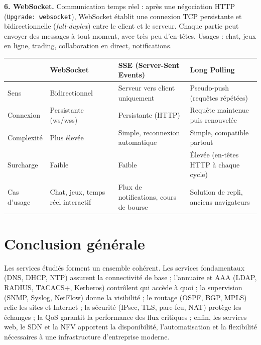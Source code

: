 \documentclass[12pt,a4paper]{article}
\begin{document}
\textbf{6. WebSocket.} Communication temps réel : après une négociation
HTTP (\texttt{Upgrade: websocket}), WebSocket établit une connexion TCP
persistante et bidirectionnelle (\textit{full-duplex}) entre le client et
le serveur. Chaque partie peut envoyer des messages à tout moment, avec
très peu d'en-têtes. Usages : chat, jeux en ligne, trading, collaboration
en direct, notifications.

\begin{longtable}{|L{2.2cm}|L{4.1cm}|L{4.1cm}|L{4.1cm}|}
\hline
 & \textbf{WebSocket} & \textbf{SSE (Server-Sent Events)} &
\textbf{Long Polling} \\ \hline
Sens & Bidirectionnel & Serveur vers client uniquement & Pseudo-push
(requêtes répétées) \\ \hline
Connexion & Persistante (ws/wss) & Persistante (HTTP) & Requête
maintenue puis renouvelée \\ \hline
Complexité & Plus élevée & Simple, reconnexion automatique & Simple,
compatible partout \\ \hline
Surcharge & Faible & Faible & Élevée (en-têtes HTTP à chaque cycle) \\
\hline
Cas d'usage & Chat, jeux, temps réel interactif & Flux de notifications,
cours de bourse & Solution de repli, anciens navigateurs \\ \hline
\end{longtable}


\section{Conclusion générale}

Les services étudiés forment un ensemble cohérent. Les services
fondamentaux (DNS, DHCP, NTP) assurent la connectivité de base ;
l'annuaire et AAA (LDAP, RADIUS, TACACS+, Kerberos) contrôlent qui accède
à quoi ; la supervision (SNMP, Syslog, NetFlow) donne la visibilité ; le
routage (OSPF, BGP, MPLS) relie les sites et Internet ; la sécurité
(IPsec, TLS, pare-feu, NAT) protège les échanges ; la QoS garantit la
performance des flux critiques ; enfin, les services web, le SDN et la
NFV apportent la disponibilité, l'automatisation et la flexibilité
nécessaires à une infrastructure d'entreprise moderne.
\end{document}
